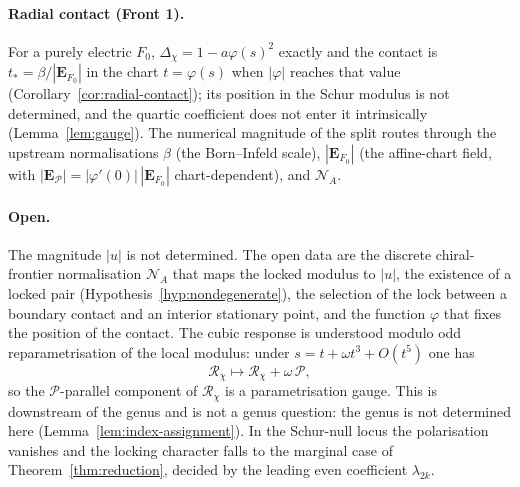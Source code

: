 \documentclass[11pt]{article}
\theoremstyle{definition}
\theoremstyle{remark}
\newcommand{\Pchi}{\mathcal{P}}
\newcommand{\Dchi}{\Delta_{\chi}}
\begin{document}
    \paragraph{Radial contact (Front 1).}
      For a purely electric $F_0$, $\Dchi=1-a\varphi(s)^2$ exactly and the contact is $t_*=\beta/|\mathbf{E}_{F_0}|$ in
      the
      chart $t=\varphi(s)$ when $|\varphi|$ reaches that value (Corollary~\ref{cor:radial-contact}); its position in the
      Schur modulus is not determined, and the quartic coefficient does not enter it intrinsically
      (Lemma~\ref{lem:gauge}).
      The numerical magnitude of the split routes through the upstream normalisations $\beta$ (the Born--Infeld scale),
      $|\mathbf{E}_{F_0}|$ (the affine-chart field, with $|\mathbf{E}_{\mathcal P}|=|\varphi'(0)|\,|\mathbf{E}_{F_0}|$ chart-dependent), and $\mathcal{N}_A$.

    \paragraph{Open.}
      The magnitude $|u|$ is not determined.
      The open data are the discrete chiral-frontier normalisation $\mathcal{N}_A$ that maps the locked modulus to
      $|u|$, the existence of a locked pair (Hypothesis~\ref{hyp:nondegenerate}), the selection of the lock between a
      boundary contact and an interior stationary point, and the function $\varphi$ that fixes the position of the
      contact.
      The cubic response is understood modulo odd reparametrisation of the local modulus: under
      $s = t + \omega t^3 + O(t^5)$ one has
      \[
        \mathcal{R}_{\chi} \mapsto \mathcal{R}_{\chi} + \omega\, \Pchi ,
      \]
      so the $\Pchi$-parallel component of $\mathcal{R}_{\chi}$ is a parametrisation gauge.
      This is downstream of the genus and is not a genus question: the genus is not determined here
      (Lemma~\ref{lem:index-assignment}).
      In the Schur-null locus the polarisation vanishes and the locking character falls to the marginal case of
      Theorem~\ref{thm:reduction}, decided by the leading even coefficient $\lambda_{2k}$.
\end{document}

